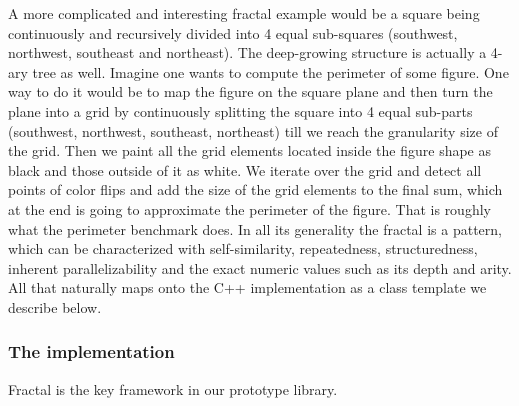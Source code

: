 \quad A more complicated and interesting fractal example would be a square being continuously and recursively divided into 4 equal sub-squares (southwest, northwest, southeast and northeast). The deep-growing structure is actually a 4-ary tree as well. Imagine one wants to compute the perimeter of some figure. One way to do it would be to map the figure on the square plane and then turn the plane into a grid by continuously splitting the square into 4 equal sub-parts (southwest, northwest, southeast, northeast) till we reach the granularity size of the grid. Then we paint all the grid elements located inside the figure shape as black and those outside of it as white. We iterate over the grid and detect all points of color flips and add the size of the grid elements to the final sum, which at the end is going to approximate the perimeter of the figure. That is roughly what the perimeter benchmark does.\newline\null
\quad In all its generality the fractal is a pattern, which can be characterized with self-similarity, repeatedness, structuredness, inherent parallelizability and the exact numeric values such as its depth and arity. All that naturally maps onto the C++ implementation as a class template we describe below.

\subsubsection{The implementation}
\quad Fractal is the key framework in our prototype library.


